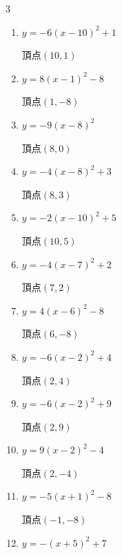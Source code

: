 \begin{multicols}{3}
\begin{enumerate}
  \item $\displaystyle y=-6\left( x-10\right)^{2}+1$

        $\displaystyle 頂点\left( 10 , 1 \right)$

  \item $\displaystyle y=8\left( x-1\right)^{2}-8$

        $\displaystyle 頂点\left( 1 , -8 \right)$

  \item $\displaystyle y=-9\left( x-8\right)^{2}$

        $\displaystyle 頂点\left( 8 , 0 \right)$

  \item $\displaystyle y=-4\left( x-8\right)^{2}+3$

        $\displaystyle 頂点\left( 8 , 3 \right)$

  \item $\displaystyle y=-2\left( x-10\right)^{2}+5$

        $\displaystyle 頂点\left( 10 , 5 \right)$

  \item $\displaystyle y=-4\left( x-7\right)^{2}+2$

        $\displaystyle 頂点\left( 7 , 2 \right)$

  \item $\displaystyle y=4\left( x-6\right)^{2}-8$

        $\displaystyle 頂点\left( 6 , -8 \right)$

  \item $\displaystyle y=-6\left( x-2\right)^{2}+4$

        $\displaystyle 頂点\left( 2 , 4 \right)$

  \item $\displaystyle y=-6\left( x-2\right)^{2}+9$

        $\displaystyle 頂点\left( 2 , 9 \right)$

  \item $\displaystyle y=9\left( x-2\right)^{2}-4$

        $\displaystyle 頂点\left( 2 , -4 \right)$

  \item $\displaystyle y=-5\left( x+1\right)^{2}-8$

        $\displaystyle 頂点\left( -1 , -8 \right)$

\columnbreak %

\resetques

  \item $\displaystyle y=-\left( x+5\right)^{2}+7$


\end{enumerate}
\end{multicols}
